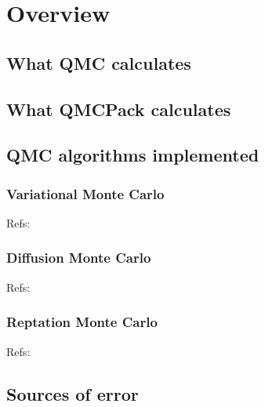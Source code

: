 \chapter{Overview}
\section{What QMC calculates}
\section{What QMCPack calculates}
\section{QMC algorithms implemented}
\subsection{Variational Monte Carlo}
Refs: \cite{PhysRev.138.A442,PhysRevB.16.3081}
\subsection{Diffusion Monte Carlo}
Refs: \cite{Ceperley1979,Schmidt1984}
\subsection{Reptation Monte Carlo}
Refs: \cite{PhysRevLett.82.4745}
\section{Sources of error}
